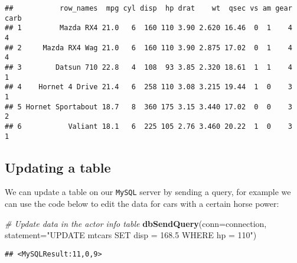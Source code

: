 \documentclass[
]{article}
\newenvironment{Shaded}{\begin{snugshade}}{\end{snugshade}}
\newcommand{\CommentTok}[1]{\textcolor[rgb]{0.56,0.35,0.01}{\textit{#1}}}
\newcommand{\DataTypeTok}[1]{\textcolor[rgb]{0.13,0.29,0.53}{#1}}
\newcommand{\DecValTok}[1]{\textcolor[rgb]{0.00,0.00,0.81}{#1}}
\newcommand{\KeywordTok}[1]{\textcolor[rgb]{0.13,0.29,0.53}{\textbf{#1}}}
\newcommand{\NormalTok}[1]{#1}
\newcommand{\OperatorTok}[1]{\textcolor[rgb]{0.81,0.36,0.00}{\textbf{#1}}}
\newcommand{\StringTok}[1]{\textcolor[rgb]{0.31,0.60,0.02}{#1}}
\begin{document}
\begin{verbatim}
##           row_names  mpg cyl disp  hp drat    wt  qsec vs am gear carb
## 1         Mazda RX4 21.0   6  160 110 3.90 2.620 16.46  0  1    4    4
## 2     Mazda RX4 Wag 21.0   6  160 110 3.90 2.875 17.02  0  1    4    4
## 3        Datsun 710 22.8   4  108  93 3.85 2.320 18.61  1  1    4    1
## 4    Hornet 4 Drive 21.4   6  258 110 3.08 3.215 19.44  1  0    3    1
## 5 Hornet Sportabout 18.7   8  360 175 3.15 3.440 17.02  0  0    3    2
## 6           Valiant 18.1   6  225 105 2.76 3.460 20.22  1  0    3    1
\end{verbatim}

\hypertarget{updating-a-table}{%
\subsection{Updating a table}\label{updating-a-table}}

We can update a table on our \texttt{MySQL} server by sending a query,
for example we can use the code below to edit the data for cars with a
certain horse power:

\begin{Shaded}
\begin{Highlighting}[]
\CommentTok{\# Update data in the actor info table}
\KeywordTok{dbSendQuery}\NormalTok{(}\DataTypeTok{conn=}\NormalTok{connection, }\DataTypeTok{statement=}\StringTok{"UPDATE mtcars SET disp = 168.5 WHERE hp = 110"}\NormalTok{)}
\end{Highlighting}
\end{Shaded}

\begin{verbatim}
## <MySQLResult:11,0,9>
\end{verbatim}

\begin{Shaded}
\end{Shaded}
\end{document}
